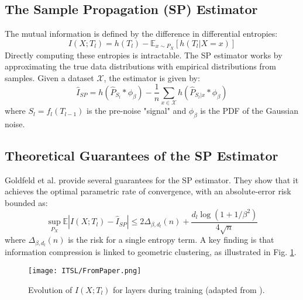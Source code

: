 \documentclass[conference]{IEEEtran}
\begin{document}
\subsection{The Sample Propagation (SP) Estimator}
The mutual information is defined by the difference in differential entropies:
\begin{equation}
I(X; T_l) = h(T_l) - \mathbb{E}_{x \sim P_X}[h(T_l | X=x)]
\end{equation}
Directly computing these entropies is intractable. The SP estimator works by approximating the true data distributions with empirical distributions from samples. Given a dataset $\mathcal{X}$, the estimator is given by:
\begin{equation}
\hat{I}_{SP} = h(\hat{P}_{S_l} * \phi_\beta) - \frac{1}{n} \sum_{x \in \mathcal{X}} h(\hat{P}_{S_l|x} * \phi_\beta)
\end{equation}
where $S_l = f_l(T_{l-1})$ is the pre-noise "signal" and $\phi_\beta$ is the PDF of the Gaussian noise.

\subsection{Theoretical Guarantees of the SP Estimator}
Goldfeld et al. \cite{goldfeld2019estimating} provide several guarantees for the SP estimator. They show that it achieves the optimal parametric rate of convergence, with an absolute-error risk bounded as:
\begin{equation}
\sup_{P_X} \mathbb{E}|I(X; T_l) - \hat{I}_{SP}| \le 2\Delta_{\beta,d_l}(n) + \frac{d_l \log(1 + 1/\beta^2)}{4\sqrt{n}}
\label{eq:goldfeld_bound}
\end{equation}
where $\Delta_{\beta,d_l}(n)$ is the risk for a single entropy term. A key finding is that information compression is linked to geometric clustering, as illustrated in Fig. \ref{fig:info_evolution}.

\begin{figure}[!t]
\centering
\texttt{[image: ITSL/FromPaper.png]}
\caption{Evolution of $I(X; T_l)$ for layers during training (adapted from \cite{goldfeld2019estimating}).}
\label{fig:info_evolution}
\end{figure}
\end{document}
